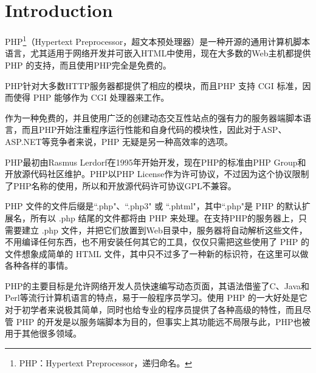 \part{Introduction}



PHP\footnote{PHP：Hypertext Preprocessor，递归命名。}（Hypertext Preprocessor，超文本预处理器）是一种开源的通用计算机脚本语言，尤其适用于网络开发并可嵌入HTML中使用，现在大多数的Web主机都提供 PHP 的支持，而且使用PHP完全是免费的。


PHP针对大多数HTTP服务器都提供了相应的模块，而且PHP 支持 CGI 标准，因而使得 PHP 能够作为 CGI 处理器来工作。

作为一种免费的，并且使用广泛的创建动态交互性站点的强有力的服务器端脚本语言，而且PHP开始注重程序运行性能和自身代码的模块性，因此对于ASP、ASP.NET等竞争者来说，PHP 无疑是另一种高效率的选项。




PHP最初由Rasmus Lerdorf在1995年开始开发，现在PHP的标准由PHP Group和开放源代码社区维护。PHP以PHP License作为许可协议，不过因为这个协议限制了PHP名称的使用，所以和开放源代码许可协议GPL不兼容。

PHP 文件的文件后缀是``.php"、``.php3" 或 ``.phtml"，其中``.php"是 PHP 的默认扩展名，所有以 .php 结尾的文件都将由 PHP 来处理。在支持PHP的服务器上，只需要建立 .php 文件，并把它们放置到Web目录中，服务器将自动解析这些文件，不用编译任何东西，也不用安装任何其它的工具，仅仅只需把这些使用了 PHP 的文件想象成简单的 HTML 文件，其中只不过多了一种新的标识符，在这里可以做各种各样的事情。

PHP的主要目标是允许网络开发人员快速编写动态页面，其语法借鉴了C、Java和Perl等流行计算机语言的特点，易于一般程序员学习。使用 PHP 的一大好处是它对于初学者来说极其简单，同时也给专业的程序员提供了各种高级的特性，而且尽管 PHP 的开发是以服务端脚本为目的，但事实上其功能远不局限与此，PHP也被用于其他很多领域。





